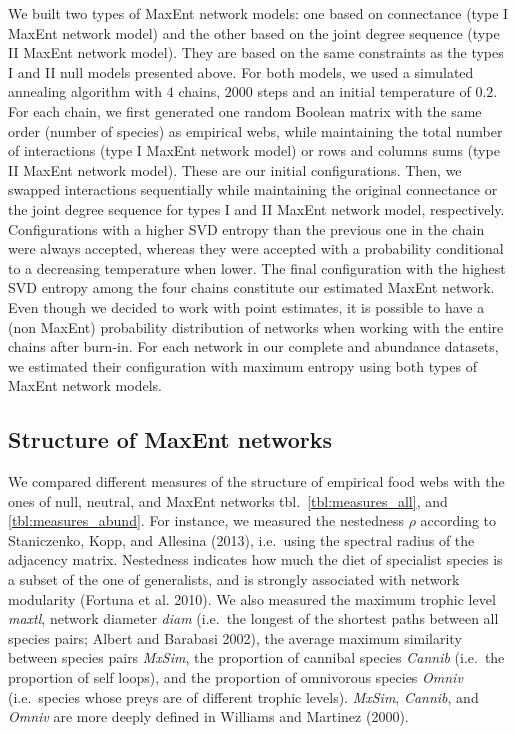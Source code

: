 \documentclass[11pt]{article}
\begin{document}
We built two types of MaxEnt network models: one based on connectance
(type I MaxEnt network model) and the other based on the joint degree
sequence (type II MaxEnt network model). They are based on the same
constraints as the types I and II null models presented above. For both
models, we used a simulated annealing algorithm with \(4\) chains,
\(2000\) steps and an initial temperature of \(0.2\). For each chain, we
first generated one random Boolean matrix with the same order (number of
species) as empirical webs, while maintaining the total number of
interactions (type I MaxEnt network model) or rows and columns sums
(type II MaxEnt network model). These are our initial configurations.
Then, we swapped interactions sequentially while maintaining the
original connectance or the joint degree sequence for types I and II
MaxEnt network model, respectively. Configurations with a higher SVD
entropy than the previous one in the chain were always accepted, whereas
they were accepted with a probability conditional to a decreasing
temperature when lower. The final configuration with the highest SVD
entropy among the four chains constitute our estimated MaxEnt network.
Even though we decided to work with point estimates, it is possible to
have a (non MaxEnt) probability distribution of networks when working
with the entire chains after burn-in. For each network in our complete
and abundance datasets, we estimated their configuration with maximum
entropy using both types of MaxEnt network models.

\hypertarget{structure-of-maxent-networks}{%
\subsection{Structure of MaxEnt
networks}\label{structure-of-maxent-networks}}

We compared different measures of the structure of empirical food webs
with the ones of null, neutral, and MaxEnt networks
tbl.~\ref{tbl:measures_all}, and \ref{tbl:measures_abund}. For instance,
we measured the nestedness \(\rho\) according to Staniczenko, Kopp, and
Allesina (2013), i.e.~using the spectral radius of the adjacency matrix.
Nestedness indicates how much the diet of specialist species is a subset
of the one of generalists, and is strongly associated with network
modularity (Fortuna et al. 2010). We also measured the maximum trophic
level \emph{maxtl}, network diameter \emph{diam} (i.e.~the longest of
the shortest paths between all species pairs; Albert and Barabasi 2002),
the average maximum similarity between species pairs \emph{MxSim}, the
proportion of cannibal species \emph{Cannib} (i.e.~the proportion of
self loops), and the proportion of omnivorous species \emph{Omniv}
(i.e.~species whose preys are of different trophic levels).
\emph{MxSim}, \emph{Cannib}, and \emph{Omniv} are more deeply defined in
Williams and Martinez (2000).
\end{document}
